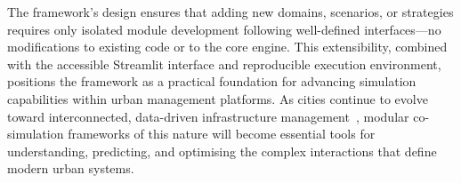 The framework's design ensures that adding new domains, scenarios, or strategies requires only isolated module development following well-defined interfaces---no modifications to existing code or to the core engine. This extensibility, combined with the accessible Streamlit interface and reproducible execution environment, positions the framework as a practical foundation for advancing simulation capabilities within urban management platforms. As cities continue to evolve toward interconnected, data-driven infrastructure management~\cite{smart_city_platforms, digital_twin_cities}, modular co-simulation frameworks of this nature will become essential tools for understanding, predicting, and optimising the complex interactions that define modern urban systems.

